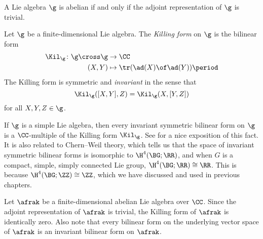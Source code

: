 \begin{example}
	A Lie algebra $ \g $ is abelian if and only if the adjoint representation of $ \g $ is trivial.
\end{example}

\begin{recollection}
	Let $ \g $ be a finite-dimensional Lie algebra.
	The \textit{Killing form} on $ \g $ is the bilinear form
	\begin{align*}
		\Kil_{\g} \colon \g \cross \g &\to \CC \\
		(X,Y) &\mapsto \tr(\ad(X) \of \ad(Y)) \period
	\end{align*}
	The Killing form is symmetric and \textit{invariant} in the sense that
	\begin{equation*}
		\Kil_{\g}([X,Y],Z) = \Kil_{\g}(X,[Y,Z])
	\end{equation*}
	for all $ X,Y,Z \in \g $.
\end{recollection}

\begin{example}
	If $ \g $ is a simple Lie algebra, then every invariant symmetric bilinear form on $ \g $ is a $ \CC $-multiple of the Killing form $ \Kil_{\g} $.
	See \cite{MSE:298287} for a nice exposition of this fact. It is also related to Chern--Weil theory, which tells
	us that the space of invariant symmetric bilinear forms is isomorphic to $\H^4(\BG;\RR)$, and when $G$ is a
	compact, simple, simply connected Lie group, $\H^4(\BG;\RR)\cong\RR$. This is because $\H^4(\BG;\ZZ)\cong\ZZ$,
	which we have discussed and used in previous chapters.
\end{example}

\begin{example}
	Let $ \afrak $ be a finite-dimensional abelian Lie algebra over $ \CC $.
	Since the adjoint representation of $ \afrak $ is trivial, the Killing form of $ \afrak $ is identically zero.
	Also note that every bilinear form on the underlying vector space of $ \afrak $ is an invariant bilinear form on $ \afrak $. 
\end{example}

